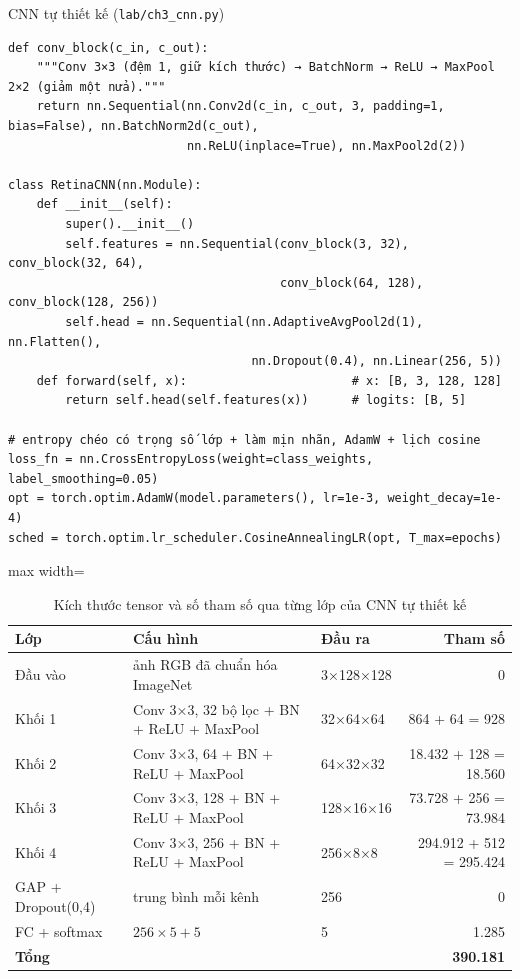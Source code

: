 \begin{code}{CNN tự thiết kế (\texttt{lab/ch3\_cnn.py})}
\label{lst:ch3-cnn}
\begin{verbatim}
def conv_block(c_in, c_out):
    """Conv 3×3 (đệm 1, giữ kích thước) → BatchNorm → ReLU → MaxPool 2×2 (giảm một nửa)."""
    return nn.Sequential(nn.Conv2d(c_in, c_out, 3, padding=1, bias=False), nn.BatchNorm2d(c_out),
                         nn.ReLU(inplace=True), nn.MaxPool2d(2))

class RetinaCNN(nn.Module):
    def __init__(self):
        super().__init__()
        self.features = nn.Sequential(conv_block(3, 32), conv_block(32, 64),
                                      conv_block(64, 128), conv_block(128, 256))
        self.head = nn.Sequential(nn.AdaptiveAvgPool2d(1), nn.Flatten(),
                                  nn.Dropout(0.4), nn.Linear(256, 5))
    def forward(self, x):                       # x: [B, 3, 128, 128]
        return self.head(self.features(x))      # logits: [B, 5]

# entropy chéo có trọng số lớp + làm mịn nhãn, AdamW + lịch cosine
loss_fn = nn.CrossEntropyLoss(weight=class_weights, label_smoothing=0.05)
opt = torch.optim.AdamW(model.parameters(), lr=1e-3, weight_decay=1e-4)
sched = torch.optim.lr_scheduler.CosineAnnealingLR(opt, T_max=epochs)
\end{verbatim}
\end{code}

\begin{table}[H]
\centering
\caption{Kích thước tensor và số tham số qua từng lớp của CNN tự thiết kế}
\label{tab:cnn-layers}
\small
\begin{adjustbox}{max width=\linewidth}
\begin{tabular}{@{}lllr@{}}
\toprule
\textbf{Lớp} & \textbf{Cấu hình} & \textbf{Đầu ra} & \textbf{Tham số} \\
\midrule
Đầu vào & ảnh RGB đã chuẩn hóa ImageNet & 3×128×128 & 0 \\
Khối 1 & Conv 3×3, 32 bộ lọc + BN + ReLU + MaxPool & 32×64×64 & 864 + 64 = 928 \\
Khối 2 & Conv 3×3, 64 + BN + ReLU + MaxPool & 64×32×32 & 18.432 + 128 = 18.560 \\
Khối 3 & Conv 3×3, 128 + BN + ReLU + MaxPool & 128×16×16 & 73.728 + 256 = 73.984 \\
Khối 4 & Conv 3×3, 256 + BN + ReLU + MaxPool & 256×8×8 & 294.912 + 512 = 295.424 \\
GAP + Dropout(0,4) & trung bình mỗi kênh & 256 & 0 \\
FC + softmax & $256\times5 + 5$ & 5 & 1.285 \\
\midrule
\textbf{Tổng} & & & \textbf{390.181} \\
\bottomrule
\end{tabular}
\end{adjustbox}
\end{table}

